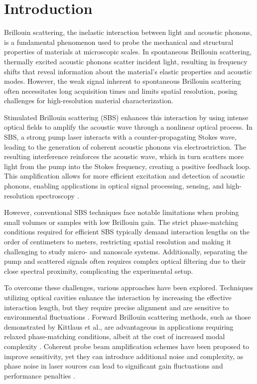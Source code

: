 \documentclass[%
  reprint,
  superscriptaddress,
  amsmath,amssymb,
  aps,
  prapplied,
]{revtex4-2}
\begin{document}
\maketitle



\section{Introduction}
\label{sec:Introduction}

Brillouin scattering, the inelastic interaction between light and acoustic phonons, is a fundamental phenomenon used to probe the mechanical and structural properties of materials at microscopic scales. In spontaneous Brillouin scattering, thermally excited acoustic phonons scatter incident light, resulting in frequency shifts that reveal information about the material's elastic properties and acoustic modes. However, the weak signal inherent to spontaneous Brillouin scattering often necessitates long acquisition times and limits spatial resolution, posing challenges for high-resolution material characterization.

Stimulated Brillouin scattering (SBS) enhances this interaction by using intense optical fields to amplify the acoustic wave through a nonlinear optical process. In SBS, a strong pump laser interacts with a counter-propagating Stokes wave, leading to the generation of coherent acoustic phonons via electrostriction. The resulting interference reinforces the acoustic wave, which in turn scatters more light from the pump into the Stokes frequency, creating a positive feedback loop. This amplification allows for more efficient excitation and detection of acoustic phonons, enabling applications in optical signal processing, sensing, and high-resolution spectroscopy \cite{boyd2020nonlinear}.

However, conventional SBS techniques face notable limitations when probing small volumes or samples with low Brillouin gain. The strict phase-matching conditions required for efficient SBS typically demand interaction lengths on the order of centimeters to meters, restricting spatial resolution and making it challenging to study micro- and nanoscale systems. Additionally, separating the pump and scattered signals often requires complex optical filtering due to their close spectral proximity, complicating the experimental setup.

To overcome these challenges, various approaches have been explored. Techniques utilizing optical cavities enhance the interaction by increasing the effective interaction length, but they require precise alignment and are sensitive to environmental fluctuations \cite{pant2011cavity}. Forward Brillouin scattering methods, such as those demonstrated by Kittlaus et al., are advantageous in applications requiring relaxed phase-matching conditions, albeit at the cost of increased modal complexity \cite{kittlaus2017chip}. Coherent probe beam amplification schemes have been proposed to improve sensitivity, yet they can introduce additional noise and complexity, as phase noise in laser sources can lead to significant gain fluctuations and performance penalties \cite{shlomovits2015effect}.
\end{document}

